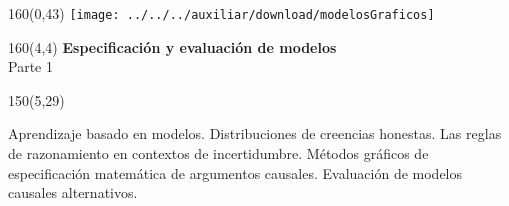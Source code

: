\documentclass[shownotes,aspectratio=169]{beamer}
\begin{document}
\begin{frame}
\begin{textblock}{160}(0,43)
\texttt{[image: ../../../auxiliar/download/modelosGraficos]}
\end{textblock}


\begin{textblock}{160}(4,4)
\LARGE \textcolor{black!85}{\fontsize{22}{0}\selectfont \textbf{Especificación y evaluación de modelos}} \\
\LARGE Parte 1
\end{textblock}

\begin{textblock}{150}(5,29)

Aprendizaje basado en modelos. Distribuciones de creencias honestas. Las reglas de razonamiento en contextos de incertidumbre. Métodos gráficos de especificación matemática de argumentos causales. Evaluación de modelos causales alternativos.
\end{textblock}
%

\end{frame}
\end{document}
